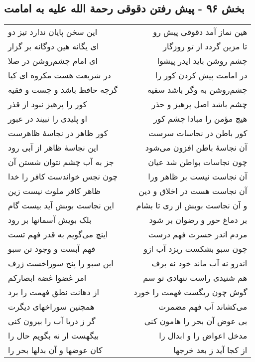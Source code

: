 \begin{center}
\section*{بخش ۹۶ - پیش رفتن دقوقی رحمة الله علیه به امامت}
\label{sec:sh096}
\begin{longtable}{l p{0.5cm} r}
این سخن پایان ندارد تیز دو
&&
هین نماز آمد دقوقی پیش رو
\\
ای یگانه هین دوگانه بر گزار
&&
تا مزین گردد از تو روزگار
\\
ای امام چشم‌روشن در صلا
&&
چشم روشن باید ایدر پیشوا
\\
در شریعت هست مکروه ای کیا
&&
در امامت پیش کردن کور را
\\
گرچه حافظ باشد و چست و فقیه
&&
چشم‌روشن به وگر باشد سفیه
\\
کور را پرهیز نبود از قذر
&&
چشم باشد اصل پرهیز و حذر
\\
او پلیدی را نبیند در عبور
&&
هیچ مؤمن را مبادا چشم کور
\\
کور ظاهر در نجاسهٔ ظاهرست
&&
کور باطن در نجاسات سرست
\\
این نجاسهٔ ظاهر از آبی رود
&&
آن نجاسهٔ باطن افزون می‌شود
\\
جز به آب چشم نتوان شستن آن
&&
چون نجاسات بواطن شد عیان
\\
چون نجس خواندست کافر را خدا
&&
آن نجاست نیست بر ظاهر ورا
\\
ظاهر کافر ملوث نیست زین
&&
آن نجاست هست در اخلاق و دین
\\
این نجاست بویش آید بیست گام
&&
و آن نجاست بویش از ری تا بشام
\\
بلک بویش آسمانها بر رود
&&
بر دماغ حور و رضوان بر شود
\\
اینچ می‌گویم به قدر فهم تست
&&
مردم اندر حسرت فهم درست
\\
فهم آبست و وجود تن سبو
&&
چون سبو بشکست ریزد آب ازو
\\
این سبو را پنج سوراخست ژرف
&&
اندرو نه آب ماند خود نه برف
\\
امر غضوا غضة ابصارکم
&&
هم شنیدی راست ننهادی تو سم
\\
از دهانت نطق فهمت را برد
&&
گوش چون ریگست فهمت را خورد
\\
همچنین سوراخهای دیگرت
&&
می‌کشاند آب فهم مضمرت
\\
گر ز دریا آب را بیرون کنی
&&
بی عوض آن بحر را هامون کنی
\\
بیگهست ار نه بگویم حال را
&&
مدخل اعواض را و ابدال را
\\
کان عوضها و آن بدلها بحر را
&&
از کجا آید ز بعد خرجها

\end{longtable}
\end{center}
